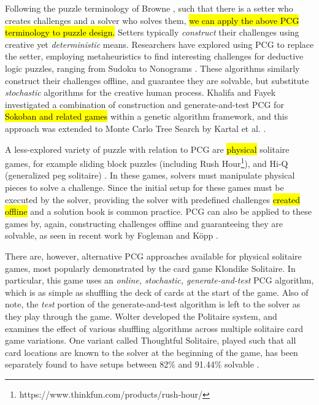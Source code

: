 \documentclass[journal]{IEEEtran}
\begin{document}
Following the puzzle terminology of Browne \cite{PUZZLENATURE}, such that there is a setter who creates challenges and a solver who solves them, \hl{we can apply the above PCG terminology to puzzle design.} Setters typically {\it construct} their challenges using creative yet {\it deterministic} means. 
Researchers have explored using PCG to replace the setter, employing metaheuristics to find interesting challenges for deductive logic puzzles, ranging from Sudoku \cite{SUDOKU} to Nonograms \cite{NONOGRAM}. These algorithms similarly construct their challenges offline, and guarantee they are solvable, but substitute {\it stochastic} algorithms for the creative human process. Khalifa and Fayek\cite{PUZZLELANG} investigated a combination of construction and generate-and-test PCG for \hl{Sokoban and related games} within a genetic algorithm framework, and this approach was extended to Monte Carlo Tree Search by Kartal et al. \cite{SOKOBAN}.

A less-explored variety of puzzle with relation to PCG 
are \hl{physical} solitaire games, for example
sliding block puzzles \cite{FIFTEEN} (including Rush Hour\footnote{https://www.thinkfun.com/products/rush-hour/}), 
and Hi-Q (generalized peg solitaire) \cite{PEG}. In these games, solvers must manipulate physical pieces to solve a challenge. Since the initial setup for these games must be executed by the solver, providing the solver with predefined challenges \hl{created offline} and a solution book is common practice. PCG can also be applied to these games by, again, constructing challenges offline and guaranteeing they are solvable, as seen in recent work by Fogleman \cite{RUSHHOUR} and K{\"o}pp \cite{TANGRAM}. 

There are, however, alternative PCG approaches available for physical solitaire games, most popularly demonstrated by the card game Klondike Solitaire. In particular, this game uses an {\it online, stochastic, generate-and-test} PCG algorithm, which is as simple as shuffling the deck of cards at the start of the game. Also of note, the {\it test} portion of the generate-and-test algorithm is left to the solver as they play through the game. Wolter \cite{SOLITAIREVARIANTS} developed the Politaire system, and examines the effect of various shuffling algorithms across multiple solitaire card game variations. One variant called Thoughtful Solitaire, played such that all card locations are known to the solver at the beginning of the game, has been separately found to have setups between 82\% and 91.44\% solvable \cite{THOUGHTFUL}. 
\end{document}
